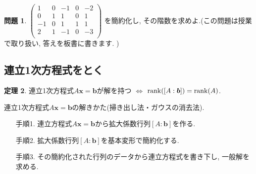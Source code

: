 \documentclass[dvipdfmx,a4paper,11pt]{article}
\theoremstyle{definition}
\newtheorem{thm}{定理}
\newtheorem{ques}[thm]{問題}
\begin{document}
\begin{ques}
$
 \begin{pmatrix}
 1& 0& -1  & 0&-2\\
 0& 1& 1  & 0&1\\
  -1& 0& 1 & 1&1\\
 2& 1& -1 & 0&-3\\
 \end{pmatrix}
 $
 を簡約化し, その階数を求めよ.(この問題は授業で取り扱い, 答えを板書に書きます. )
\end{ques}


\subsection{連立1次方程式をとく \cite[2.3節]{M}}
\begin{tcolorbox}[
    colback = white,
    colframe = green!35!black,
    fonttitle = \bfseries,
    breakable = true]
    \begin{thm}
連立1次方程式$A\bm{x} =\bm{b}$が解を持つ
$\Leftrightarrow$ ${\rm rank}([A:\bm{b}]) = {\rm rank}(A)$.
  \end{thm}
 \end{tcolorbox}

\begin{tcolorbox}[
    colback = white,
    colframe = green!35!black,
    fonttitle = \bfseries,
    breakable = true]
連立1次方程式$A\bm{x} =\bm{b}$の解きかた(掃き出し法・ガウスの消去法).
 \begin{enumerate}
 \item[手順1.] 連立方程式$A\bm{x} =\bm{b}$から拡大係数行列$[A:\bm{b}]$を作る.
 \item[手順2.] 拡大係数行列$[A:\bm{b}]$を基本変形で簡約化する.
 \item[手順3.] その簡約化された行列のデータから連立方程式を書き下し, 一般解を求める.
 \end{enumerate}
 \end{tcolorbox}
 
\end{document}
